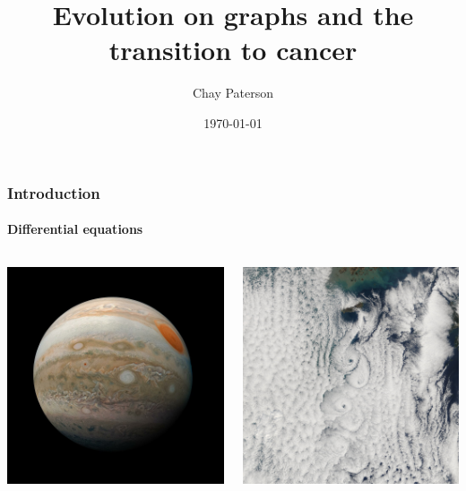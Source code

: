 \documentclass{beamer}
\title{Evolution on graphs and the transition to cancer}
\author{Chay Paterson}
\institute{University of Manchester}
\date{\today}
\begin{document}
\frame{\titlepage}

\begin{frame}
    \frametitle{Introduction}
    \framesubtitle{Differential equations}

    \begin{columns}
        \begin{column}{0.5\textwidth}
        \includegraphics[width=\textwidth]{figures/PIA22946-Jupiter-RedSpot-JunoSpacecraft-20190212.jpg}
        \end{column}
        \begin{column}{0.5\textwidth}
        \includegraphics[width=\textwidth]{figures/Cloud_vortices_off_Cheju_Do_cropped.jpg}

\end{column}
\end{columns}
\end{frame}
\end{document}
